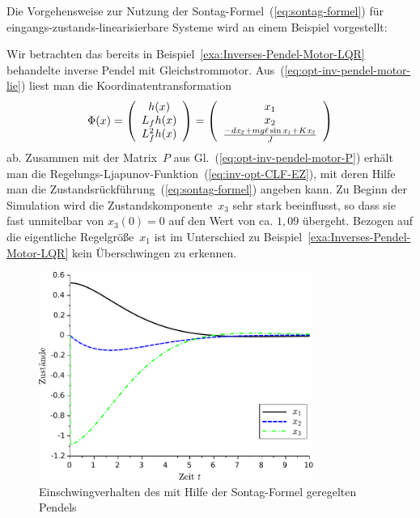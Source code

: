 Die Vorgehensweise zur Nutzung der Sontag-Formel~(\ref{eq:sontag-formel})
für eingangs-zustands-linearisierbare Systeme wird an einem Beispiel
vorgestellt:

\begin{example}
Wir betrachten das bereits in Beispiel~\ref{exa:Inverses-Pendel-Motor-LQR}
behandelte inverse Pendel mit Gleichstrommotor. Aus~(\ref{eq:opt-inv-pendel-motor-lie})
liest man die Koordinatentransformation 
\[
\Phi(x)=\left(\begin{array}{c}
h(x)\\
L_{f}h(x)\\
L_{f}^{2}h(x)
\end{array}\right)=\left(\begin{array}{c}
x_{1}\\
x_{2}\\
\frac{-d{\it x_{2}}+mg\ell\sin{\it x_{1}}+K{\it x_{3}}}{J}
\end{array}\right)
\]
ab. Zusammen mit der Matrix~$P$ aus Gl.~(\ref{eq:opt-inv-pendel-motor-P})
erhält man die Regelungs-Ljapunov-Funktion~(\ref{eq:inv-opt-CLF-EZ}),
mit deren Hilfe man die Zustandsrückführung~(\ref{eq:sontag-formel})
angeben kann. Zu Beginn der Simulation wird die Zustandskomponente~$x_{3}$
sehr stark beeinflusst, so dass sie fast unmitelbar von $x_{3}(0)=0$
auf den Wert von ca. $1,09$ übergeht. Bezogen auf die eigentliche
Regelgröße~$x_{1}$ ist im Unterschied zu Beispiel~\ref{exa:Inverses-Pendel-Motor-LQR}
kein Überschwingen zu erkennen.

\begin{figure}
\begin{centering}
\includegraphics[width=0.8\textwidth]{Inv_Pendel_Motor_Sontag}
\par\end{centering}
\caption{Einschwingverhalten des mit Hilfe der Sontag-Formel geregelten Pendels\label{fig:opt-inv-pendel-motor-sontag}}
\end{figure}
\end{example}



